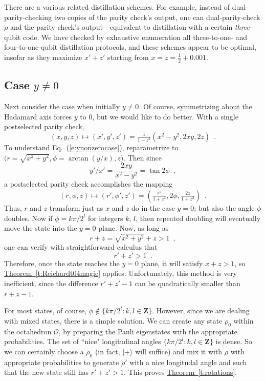 \documentclass[11pt]{article}
\def\ket #1{\vert #1\rangle}
\newcommand{\beq}{\begin{equation}}
\newcommand{\eeq}{\end{equation}}
\theoremstyle{note}
\newcommand{\eqnref}[1]{\hyperref[#1]{{(\ref*{#1})}}}
\newcommand{\thmref}[1]{\hyperref[#1]{{Theorem~\ref*{#1}}}}
\begin{document}
There are a various related distillation schemes.  For example, instead of dual-parity-checking two copies of the parity check's output, one can dual-parity-check $\rho$ and the parity check's output---equivalent to distillation with a certain \emph{three}-qubit code.  We have checked by exhaustive enumeration all three-to-one- and four-to-one-qubit distillation protocols, and these schemes appear to be optimal, insofar as they maximize $x'+z'$ starting from $x=z=\tfrac{1}{2}+0.001$.


\subsection{Case $y \neq 0$}

Next consider the case when initially $y \neq 0$.  Of course, symmetrizing about the Hadamard axis forces $y$ to 0, but we would like to do better.  With a single postselected parity check, 
\beq \label{e:ynonzerocase}
(x,y,z) \mapsto (x',y',z') = \tfrac{1}{1+z^2}(x^2-y^2, 2 x y, 2 z)
 \enspace .
\eeq
To understand Eq.~\eqnref{e:ynonzerocase}, reparametrize to $\big(r=\sqrt{x^2+y^2}, \phi = \arctan(y/x), z\big)$.  Then since 
\beq
y'/x' = \frac{2xy}{x^2-y^2} = \tan 2\phi
 \enspace ,
\eeq
a postselected parity check accomplishes the mapping 
\beq
(r, \phi, z) \mapsto (r', \phi', z') = (\tfrac{r^2}{1+z^2}, 2\phi, \tfrac{2z}{1+z^2})
 \enspace .
\eeq
Thus, $r$ and $z$ transform just as $x$ and $z$ do in the case $y=0$; but also the angle $\phi$ doubles.  Now if $\phi = k \pi / 2^l$ for integers $k$, $l$, then repeated doubling will eventually move the state into the $y = 0$ plane.  Now, as long as 
\beq
r + z  = \sqrt{x^2+y^2} + z > 1
 \enspace ,
\eeq
one can verify with straightforward calculus that 
\beq
r' + z' > 1
 \enspace .
\eeq
Therefore, once the state reaches the $y = 0$ plane, it will satisfy $x+z > 1$, so \thmref{t:Reichardt04magic} applies.  Unfortunately, this method is very inefficient, since the difference $r' + z' - 1$ can be quadratically smaller than $r + z -1$.  

For most states, of course, $\phi \notin \{ k \pi / 2^l : k, l \in \mathbf{Z}\}$.  However, since we are dealing with mixed states, there is a simple solution.  We can create any state $\rho_0$ within the octahedron $\mathcal{O}$, by preparing the Pauli eigenstates with the appropriate probabilities.  The set of ``nice" longitudinal angles $\{ k \pi / 2^l : k, l \in \mathbf{Z}\}$ is dense.  So we can certainly choose a $\rho_0$ (in fact, $\ket{+}$ will suffice) and mix it with $\rho$ with appropriate probabilities to generate $\rho'$ with a nice longitudal angle and such that the new state still has $r'+z'>1$.  This proves \thmref{t:rotations}.  
\end{document}

